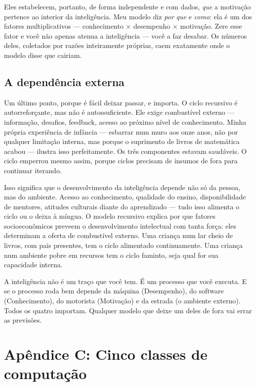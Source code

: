 \documentclass[11pt, twoside, openright]{book}
\begin{document}
Eles estabelecem, portanto, de forma independente e com dados, \textit{que} a motivação pertence ao interior da inteligência. Meu modelo diz \textit{por que} e \textit{como}: ela é um dos fatores multiplicativos --- conhecimento × desempenho × motivação. Zere esse fator e você não apenas atenua a inteligência --- você a faz desabar. Os números deles, coletados por razões inteiramente próprias, caem exatamente onde o modelo disse que cairiam.

\section*{A dependência externa}

Um último ponto, porque é fácil deixar passar, e importa. O ciclo recursivo é autorreforçante, mas não é autossuficiente. Ele exige combustível externo --- informação, desafios, feedback, acesso ao próximo nível de conhecimento. Minha própria experiência de infância --- esbarrar num muro aos onze anos, não por qualquer limitação interna, mas porque o suprimento de livros de matemática acabou --- ilustra isso perfeitamente. Os três componentes estavam saudáveis. O ciclo emperrou mesmo assim, porque ciclos precisam de insumos de fora para continuar iterando.

Isso significa que o desenvolvimento da inteligência depende não só da pessoa, mas do ambiente. Acesso ao conhecimento, qualidade do ensino, disponibilidade de mentores, atitudes culturais diante do aprendizado --- tudo isso alimenta o ciclo ou o deixa à míngua. O modelo recursivo explica por que fatores socioeconômicos preveem o desenvolvimento intelectual com tanta força: eles determinam a oferta de combustível externo. Uma criança num lar cheio de livros, com pais presentes, tem o ciclo alimentado continuamente. Uma criança num ambiente pobre em recursos tem o ciclo faminto, seja qual for sua capacidade interna.

A inteligência não é um traço que você tem. É um processo que você executa. E se o processo roda bem depende da máquina (Desempenho), do software (Conhecimento), do motorista (Motivação) e da estrada (o ambiente externo). Todos os quatro importam. Qualquer modelo que deixe um deles de fora vai errar as previsões.


\chapter*{Apêndice C: Cinco classes de computação}
\end{document}
